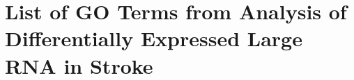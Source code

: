 \chapter{List of GO Terms from Analysis of Differentially Expressed Large RNA in Stroke} 
\label{appendix:go-terms-large-rna}
